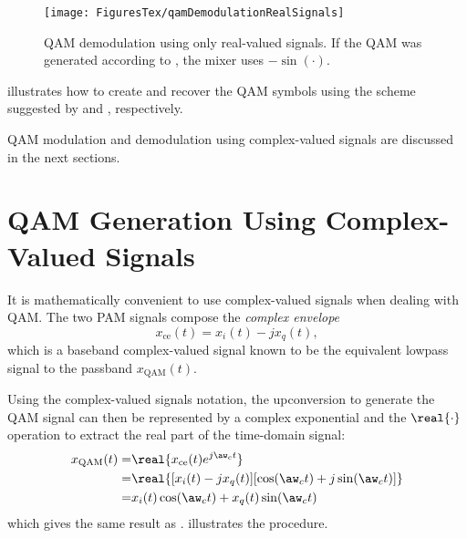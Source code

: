 \begin{figure}[htbp]
	\centering
		\texttt{[image: FiguresTex/qamDemodulationRealSignals]}		
	\caption{QAM demodulation using only real-valued signals. If the QAM was generated according to , the mixer uses $-\sin(\cdot)$.\label{fig:qamDemodulationRealSignals}}
\end{figure}

 illustrates how to create and recover the QAM symbols using the scheme suggested by  and , respectively. 


%




QAM modulation and demodulation using complex-valued signals are discussed in the next sections.

\section{QAM Generation Using Complex-Valued Signals}

It is mathematically convenient to use complex-valued signals when dealing with QAM. The two PAM signals compose the \emph{complex envelope}
\[
x_\textrm{ce}(t) = x_i(t) - j x_q(t),
\]
which is a baseband complex-valued signal known to be the equivalent lowpass signal to the passband $x_{\textrm{QAM}}(t)$.

Using the complex-valued signals notation, the upconversion to generate the QAM signal can then be represented by a complex exponential and the $\real{\cdot}$ operation to extract the real part of the time-domain signal:
\begin{align}
x_{\textrm{QAM}}(t) = & \real{ x_\textrm{ce}(t) e^{j \aw_c t} } \notag \\
 = & \real{ [x_i(t)- jx_q(t)] [\cos(\aw_c t)+j\sin(\aw_c t)]} \notag \\
 = & x_i(t) \cos(\aw_c t) + x_q(t) \sin(\aw_c t) 
\label{eq:qam_complex}
\end{align}
which gives the same result as .
 illustrates the procedure.

